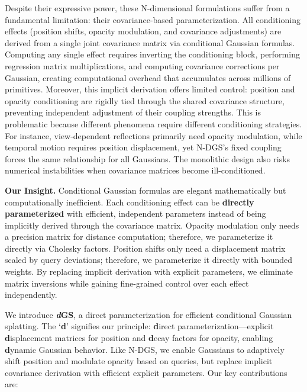 \documentclass{article}
\newcommand{\modelname}{\textit{d}GS}
\theoremstyle{plain}
\theoremstyle{definition}
\theoremstyle{remark}
\begin{document}
Despite their expressive power, these N-dimensional formulations suffer from a fundamental limitation: their covariance-based parameterization. All conditioning effects (position shifts, opacity modulation, and covariance adjustments) are derived from a single joint covariance matrix via conditional Gaussian formulas. Computing any single effect requires inverting the conditioning block, performing regression matrix multiplications, and computing covariance corrections per Gaussian, creating computational overhead that accumulates across millions of primitives. Moreover, this implicit derivation offers limited control: position and opacity conditioning are rigidly tied through the shared covariance structure, preventing independent adjustment of their coupling strengths. This is problematic because different phenomena require different conditioning strategies. For instance, view-dependent reflections primarily need opacity modulation, while temporal motion requires position displacement, yet N-DGS's fixed coupling forces the same relationship for all Gaussians. The monolithic design also risks numerical instabilities when covariance matrices become ill-conditioned.

\textbf{Our Insight.} Conditional Gaussian formulas are elegant mathematically but computationally inefficient. Each conditioning effect can be \textbf{directly parameterized} with efficient, independent parameters instead of being implicitly derived through the covariance matrix. Opacity modulation only needs a precision matrix for distance computation; therefore, we parameterize it directly via Cholesky factors. Position shifts only need a displacement matrix scaled by query deviations; therefore, we parameterize it directly with bounded weights. By replacing implicit derivation with explicit parameters, we eliminate matrix inversions while gaining fine-grained control over each effect independently.

We introduce \textbf{\modelname{}}, a direct parameterization for efficient conditional Gaussian splatting. The `\textbf{d}' signifies our principle: \textbf{d}irect parameterization---explicit \textbf{d}isplacement matrices for position and \textbf{d}ecay factors for opacity, enabling \textbf{d}ynamic Gaussian behavior. Like N-DGS, we enable Gaussians to adaptively shift position and modulate opacity based on queries, but replace implicit covariance derivation with efficient explicit parameters. Our key contributions are:
\end{document}
